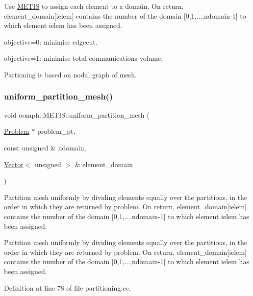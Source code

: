 Use \hyperlink{namespaceoomph_1_1METIS}{M\+E\+T\+IS} to assign each element to a domain. On return, element\+\_\+domain\mbox{[}ielem\mbox{]} contains the number of the domain \mbox{[}0,1,...,ndomain-\/1\mbox{]} to which element ielem has been assigned. 


\begin{DoxyItemize}
\item objective=0\+: minimise edgecut.
\item objective=1\+: minimise total communications volume.
\end{DoxyItemize}Partioning is based on nodal graph of mesh. \mbox{\label{namespaceoomph_1_1METIS_a58831157b0cfadc57485c3de01df7d78}} 
\subsubsection{\texorpdfstring{uniform\+\_\+partition\+\_\+mesh()}{uniform\_partition\_mesh()}}
{\footnotesize\ttfamily void oomph\+::\+M\+E\+T\+I\+S\+::uniform\+\_\+partition\+\_\+mesh (\begin{DoxyParamCaption}\item[{\hyperlink{classoomph_1_1Problem}{Problem} $\ast$}]{problem\+\_\+pt,  }\item[{const unsigned \&}]{ndomain,  }\item[{\hyperlink{classoomph_1_1Vector}{Vector}$<$ unsigned $>$ \&}]{element\+\_\+domain }\end{DoxyParamCaption})}



Partition mesh uniformly by dividing elements equally over the partitions, in the order in which they are returned by problem. On return, element\+\_\+domain\mbox{[}ielem\mbox{]} contains the number of the domain \mbox{[}0,1,...,ndomain-\/1\mbox{]} to which element ielem has been assigned. 

Partition mesh uniformly by dividing elements equally over the partitions, in the order in which they are returned by problem. On return, element\+\_\+domain\mbox{[}ielem\mbox{]} contains the number of the domain \mbox{[}0,1,...,ndomain-\/1\mbox{]} to which element ielem has been assigned. 

Definition at line 78 of file partitioning.\+cc.



